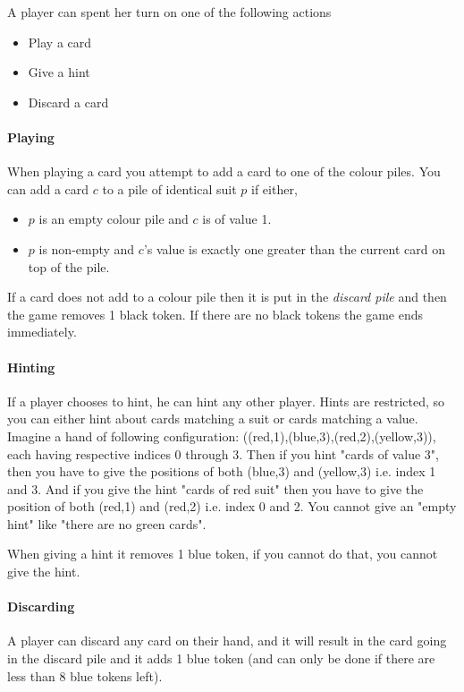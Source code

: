 A player can spent her turn on one of the following actions

\begin{itemize}
\item Play a card
\item Give a hint
\item Discard a card
\end{itemize}

\paragraph{Playing}
When playing a card you attempt to add a card to one of the colour piles.
You can add a card $c$ to a pile of identical suit $p$ if either, 

\begin{itemize}	
\item $p$ is an empty colour pile and $c$ is of value 1.
\item $p$ is non-empty and $c$'s value is exactly one greater than the current card on top of the pile.
\end{itemize}

If a card does not add to a colour pile then it is put in the \emph{discard pile} and then the game removes 1 black token. 
If there are no black tokens the game ends immediately.  

\paragraph{Hinting}
If a player chooses to hint, he can hint any other player. Hints are restricted, so you can either hint about cards matching a suit or cards matching a value. 
Imagine a hand of following configuration: ((red,1),(blue,3),(red,2),(yellow,3)), each having respective indices 0 through 3. 
Then if you hint "cards of value 3", then you have to give the positions of both (blue,3) and (yellow,3) i.e. index 1 and 3. 
And if you give the hint "cards of red suit" then you have to give the position of both (red,1) and (red,2) i.e. index 0 and 2. 
You cannot give an "empty hint" like "there are no green cards".

When giving a hint it removes 1 blue token, if you cannot do that, you cannot give the hint.

\paragraph{Discarding}
A player can discard any card on their hand, and it will result in the card going in the discard pile and it adds 1 blue token (and can only be done if there are less than 8 blue tokens left).

